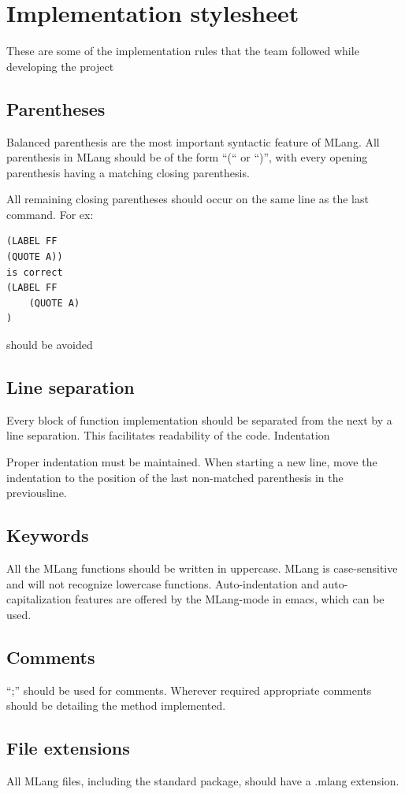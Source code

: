 \documentclass[letterpaper,11pt]{article}
\begin{document}
{\section{Implementation stylesheet}

These are some of the implementation rules that the team followed while developing the project

\subsection{Parentheses}
Balanced parenthesis are the most important syntactic feature of MLang. All parenthesis in MLang should be of the form “(“ or “)”, with every opening parenthesis having a matching closing parenthesis.  

All remaining closing parentheses should occur on the same line as the last command. For ex:

\begin{lstlisting}
(LABEL FF
(QUOTE A))  
is correct
(LABEL FF 
	(QUOTE A)
)
\end{lstlisting}
should be avoided

\subsection{Line separation}
Every block of function implementation should be separated from the next by a line separation. This facilitates readability of the code.
Indentation

Proper indentation must be maintained. When starting a new line, move the indentation to the position of the last non-matched parenthesis in the previousline.
 
\subsection{Keywords}
All the MLang functions should be written in uppercase. MLang is case-sensitive and will not recognize lowercase functions. Auto-indentation and auto-capitalization features are offered by the MLang-mode in emacs, which can be used.

\subsection{Comments}
“;” should be used for comments. Wherever required appropriate comments should be detailing the method implemented.

\subsection{File extensions}
All MLang files, including the standard package, should have a .mlang extension. 

}
\end{document}
